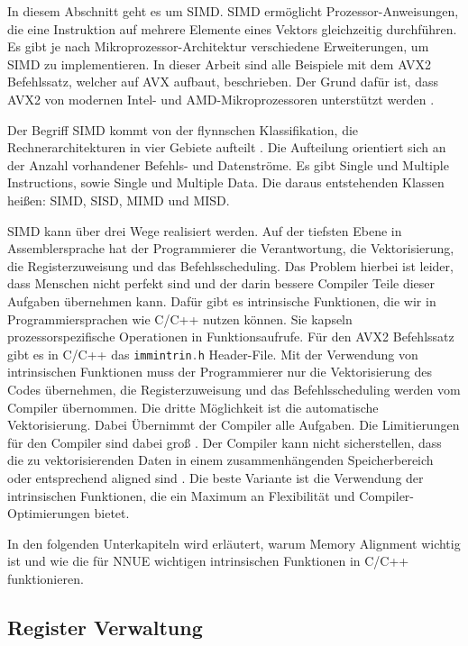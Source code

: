 In diesem Abschnitt geht es um \ac{SIMD}. \ac{SIMD} ermöglicht Prozessor-Anweisungen, die eine Instruktion auf mehrere Elemente eines Vektors gleichzeitig durchführen. Es gibt je nach Mikroprozessor-Architektur verschiedene Erweiterungen, um \ac{SIMD} zu implementieren. In dieser Arbeit sind alle Beispiele mit dem \ac{AVX2} Befehlssatz, welcher auf \ac{AVX} aufbaut, beschrieben. Der Grund dafür ist, dass \ac{AVX2} von modernen Intel- und AMD-Mikroprozessoren unterstützt werden \cite[S. 117]{fog2006optimizing}.

Der Begriff \ac{SIMD} kommt von der flynnschen Klassifikation, die Rechnerarchitekturen in vier Gebiete aufteilt \cite{Flynn1972}. Die Aufteilung orientiert sich an der Anzahl vorhandener Befehls- und Datenströme. Es gibt Single und Multiple Instructions, sowie Single und Multiple Data. Die daraus entstehenden Klassen heißen: \ac{SIMD}, \ac{SISD}, \ac{MIMD} und \ac{MISD}.

\ac{SIMD} kann über drei Wege realisiert werden. Auf der tiefsten Ebene in Assemblersprache hat der Programmierer die Verantwortung, die Vektorisierung, die Registerzuweisung und das Befehlsscheduling. Das Problem hierbei ist leider, dass Menschen nicht perfekt sind und der darin bessere Compiler Teile dieser Aufgaben übernehmen kann. Dafür gibt es intrinsische Funktionen, die wir in Programmiersprachen wie C/C++ nutzen können. Sie kapseln prozessorspezifische Operationen in Funktionsaufrufe. Für den \ac{AVX2} Befehlssatz gibt es in C/C++ das \lstinline[language=C++]{immintrin.h} Header-File. Mit der Verwendung von intrinsischen Funktionen muss der Programmierer nur die Vektorisierung des Codes übernehmen, die Registerzuweisung und das Befehlsscheduling werden vom Compiler übernommen. Die dritte Möglichkeit ist die automatische Vektorisierung. Dabei Übernimmt der Compiler alle Aufgaben. Die Limitierungen für den Compiler sind dabei groß \cite{ren2003preliminary}. Der Compiler kann nicht sicherstellen, dass die zu vektorisierenden Daten in einem zusammenhängenden Speicherbereich oder entsprechend aligned sind \cite[S. 118-120]{fog2006optimizing}. Die beste Variante ist die Verwendung der intrinsischen Funktionen, die ein Maximum an Flexibilität und Compiler-Optimierungen bietet.

In den folgenden Unterkapiteln wird erläutert, warum Memory Alignment wichtig ist und wie die für \ac{NNUE} wichtigen intrinsischen Funktionen in C/C++ funktionieren.

\subsection{Register Verwaltung}

